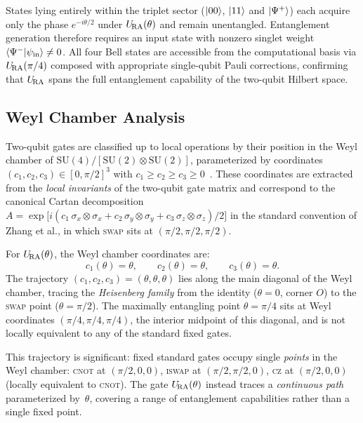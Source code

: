 States lying entirely within the triplet sector ($\ket{00}$, $\ket{11}$ and $\ket{\Psi^+}$) each acquire only the phase $e^{-i\theta/2}$ under
$U_{\!\mathrm{RA}}(\theta)$ and remain unentangled.
Entanglement generation therefore requires an input state with nonzero
singlet weight $\langle\Psi^-\vert\psi_{\rm in}\rangle \neq 0$.
All four Bell states are accessible from the computational basis via
$U_{\!\mathrm{RA}}(\pi/4)$ composed with appropriate single-qubit Pauli corrections,
confirming that $U_{\!\mathrm{RA}}$ spans the full entanglement capability of the
two-qubit Hilbert space.

\subsection{Weyl Chamber Analysis}
\label{subsec:weyl}

Two-qubit gates are classified up to local operations by their position in
the Weyl chamber of $\mathrm{SU}(4)/[\mathrm{SU}(2)\otimes\mathrm{SU}(2)]$,
parameterized by coordinates $(c_1, c_2, c_3) \in [0,\pi/2]^3$ with
$c_1 \geq c_2 \geq c_3 \geq 0$~\cite{Zhang2003WeylChamber}.
These coordinates are extracted from the \emph{local invariants} of the
two-qubit gate matrix and correspond to the canonical Cartan
decomposition $A = \exp\!\bigl[i(c_1\,\sigma_x{\otimes}\sigma_x +
c_2\,\sigma_y{\otimes}\sigma_y + c_3\,\sigma_z{\otimes}\sigma_z)/2\bigr]$
in the standard convention of Zhang et al., in which \textsc{swap}
sits at $(\pi/2, \pi/2, \pi/2)$.

For $U_{\!\mathrm{RA}}(\theta)$, the Weyl chamber coordinates are:
\begin{equation}
  c_1(\theta) = \theta, \qquad
  c_2(\theta) = \theta, \qquad
  c_3(\theta) = \theta.
  \label{eq:weyl-coords}
\end{equation}
The trajectory $(c_1, c_2, c_3) = (\theta, \theta, \theta)$ lies along the
main diagonal of the Weyl chamber, tracing the \emph{Heisenberg family} from the
identity ($\theta = 0$, corner $O$) to the \textsc{swap} point ($\theta = \pi/2$).
The maximally entangling point $\theta = \pi/4$ sits at Weyl coordinates
$(\pi/4, \pi/4, \pi/4)$, the interior midpoint of this diagonal, and is not locally equivalent to any of the standard fixed gates.

This trajectory is significant: fixed standard gates occupy single
\emph{points} in the Weyl chamber: \textsc{cnot} at $(\pi/2, 0, 0)$,
\textsc{iswap} at $(\pi/2, \pi/2, 0)$, \textsc{cz} at $(\pi/2, 0, 0)$
(locally equivalent to \textsc{cnot}).
The gate $U_{\!\mathrm{RA}}(\theta)$ instead traces a \emph{continuous path} parameterized
by~$\theta$, covering a range of entanglement capabilities rather than a
single fixed point.

